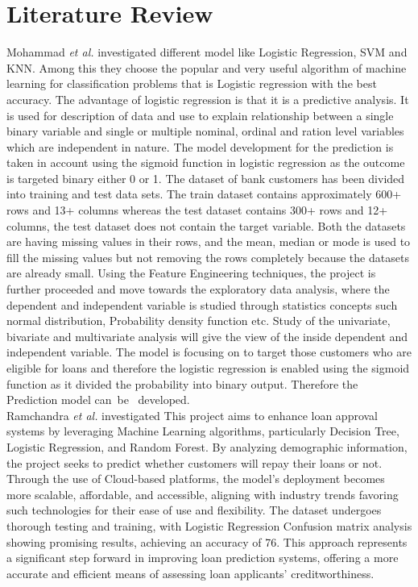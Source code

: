 \documentclass[conference]{IEEEtran}
\begin{document}
	\section{Literature Review}
	
	Mohammad \textit{et al.}\cite{p1} investigated different model like Logistic Regression, SVM and KNN. Among this they choose the popular and very useful algorithm 
	of machine learning for classification problems that is Logistic regression with the best accuracy. The advantage 
	of logistic regression is that it is a predictive analysis. It is 
	used for description of data and use to explain relationship 
	between a single binary variable and single or multiple 
	nominal, ordinal and ration level variables which are 
	independent in nature. 
	The model development for the prediction is taken in 
	account using the sigmoid function in logistic regression as the 
	outcome is targeted binary either 0 or 1. The dataset of 
	bank customers has been divided into training and test data 
	sets. The train dataset contains approximately 600+ rows and 
	13+ columns whereas the test dataset contains 300+ rows and 
	12+ columns, the test dataset does not contain the target 
	variable. Both the datasets are having missing values in their 
	rows, and the mean, median or mode is used to fill the missing 
	values but not removing the rows completely because the 
	datasets are already small. Using the Feature Engineering 
	techniques, the project is further proceeded and move towards 
	the exploratory data analysis, where the dependent and 
	independent variable is studied through statistics concepts such 
	normal distribution, Probability density function etc. Study of 
	the univariate, bivariate and multivariate analysis will give the 
	view of the inside dependent and independent variable. The model is focusing on to target those customers who are eligible for loans and therefore the logistic regression is enabled using the sigmoid function as it divided the probability 
	into binary output. Therefore the Prediction model can be 
	developed.\\
	
	Ramchandra \textit{et al.}\cite{p2} investigated This project aims to enhance loan approval systems by leveraging Machine Learning algorithms, particularly Decision Tree, Logistic Regression, and Random Forest. By analyzing demographic information, the project seeks to predict whether customers will repay their loans or not. Through the use of Cloud-based platforms, the model's deployment becomes more scalable, affordable, and accessible, aligning with industry trends favoring such technologies for their ease of use and flexibility. The dataset undergoes thorough testing and training, with Logistic Regression Confusion matrix analysis showing promising results, achieving an accuracy of 76. This approach represents a significant step forward in improving loan prediction systems, offering a more accurate and efficient means of assessing loan applicants' creditworthiness.\\
	
\end{document}

